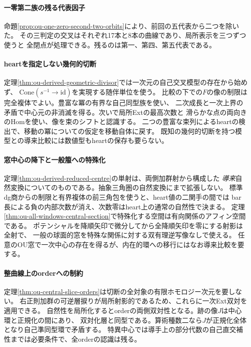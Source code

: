 \documentclass[11pt,a4paper]{ltjsarticle}
\begin{document}
\paragraph{一零第二族の残る代表因子}
命題\ref{prop:ou-one-zero-second-two-orbits}により、前回の五代表から二つを除いた。
その三判定の交叉はそれぞれ17本と8本の曲線であり、局所表示を三つずつ使うと
全閉点が処理できる。残るのは第一、第四、第五代表である。

\paragraph{heartを指定しない幾何的切断}
定理\ref{thm:ou-derived-geometric-divisor}では一次元の自己交叉模型の存在から始めず、
$\mathrm{Cone}(s^{-1}\to\mathrm{id})$を実現する随伴単位を使う。
比較の下での$F$の像の制限は完全複体でよい。豊富な冪の有界な自己同型族を使い、
二次成長と一次上界の矛盾で中心元の非消滅を得る。次いで局所Extの最高次数と
滑らかな点の両向きのHomを使い、像を束のシフトと認識する。
二つの豊富な束列によるheartの検出で、移動の冪についての仮定を移動自体に戻す。
既知の幾何的切断を持つ模型との導来比較には数値型もheartの保存も要らない。

\paragraph{窓中心の降下と一般箙への特殊化}
定理\ref{thm:ou-derived-reduced-centre}の単射は、両側加群射から構成した
\emph{導来}自然変換についてのものである。抽象三角圏の自然変換にまで拡張しない。
標準dg商からの制限と有界複体の前三角包を使うと、heart値の二関手の間では
bar長による負の内部次数が消え、次数零はheart上の通常の自然性で決まる。
定理\ref{thm:ou-all-windows-central-section}で特殊化する空間は有向関係のアフィン空間である。
ポテンシャルを降順矢印で微分してから全降順矢印を零にする射影は全射で、
一般の球面的窓を特殊な関係に対する双有理逆写像なしで使える。
任意のOU窓で一次中心の存在を得るが、内在的環への移行にはなお導来比較を要する。

\paragraph{整曲線上のorderへの制約}
定理\ref{thm:ou-central-slice-orders}は切断の全対象の有限ホモロジー次元を要しない。
右正則加群の可逆層捩りが局所射影的であるため、これらに一次Ext双対を適用できる。
自然性を局所化するとorderの両側双対性となる。跡の像$J$は中心環と正規化の間にあり、
双対化層と同型である。算術種数二なら$J$が正規化全体となり自己準同型環で矛盾する。
特異中心では導手上の部分代数の自己直交補性までは必要条件で、全orderの認識は残る。
\end{document}
